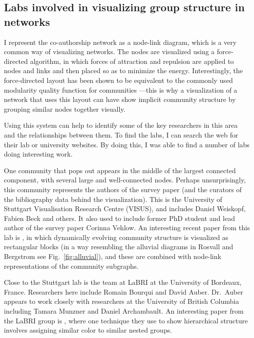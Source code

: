
\subsection{Labs involved in visualizing group structure in
networks}\label{labs-involved-in-visualizing-group-structure-in-networks}

I represent the co-authorship network as a node-link diagram, which is a
very common way of visualizing networks. The nodes are visualized using
a force-directed algorithm, in which forces of attraction and repulsion
are applied to nodes and links and then placed so as to minimize the
energy. Interestingly, the force-directed layout has been shown to be
equivalent to the commonly used modularity quality function for
communities \autocite{noack_modularity_2009}---this is why a
visualization of a network that uses this layout can have show implicit
community structure by grouping similar nodes together visually.

Using this system can help to identify some of the key researchers in
this area and the relationships between them. To find the labs, I can
search the web for their lab or university websites. By doing this, I
was able to find a number of labs doing interesting work.

One community that pops out appears in the middle of the largest
connected component, with several large and well-connected nodes.
Perhaps unsurprisingly, this community represents the authors of the
survey paper (and the curators of the bibliography data behind the
visualization). This is the University of Stuttgart Visualisation
Research Centre (VISUS), and includes Daniel Weiskopf, Fabien Beck and
others. It also used to include former PhD student and lead author of
the survey paper Corinna Vehlow. An interesting recent paper from this
lab is \autocite{vehlow_visualizing_2015}, in which dynamically evolving
community structure is visualized as rectangular blocks (in a way
resembling the alluvial diagrams in Rosvall and Bergstrom
\autocite{rosvall_mapping_2010} see Fig.~\ref{fig:alluvial}), and these
are combined with node-link representations of the community subgraphs.

Close to the Stuttgart lab is the team at LaBRI at the University of
Bordeaux, France. Researchers here include Romain Bourqui and David
Auber. Dr.~Auber appears to work closely with researchers at the
University of British Columbia including Tamara Munzner and Daniel
Archambault. An interesting paper from the LaBRI group is
\autocite{sansen_adjasankey:_2015}, where one technique they use to show
hierarchical structure involves assigning similar color to similar
nested groups.

